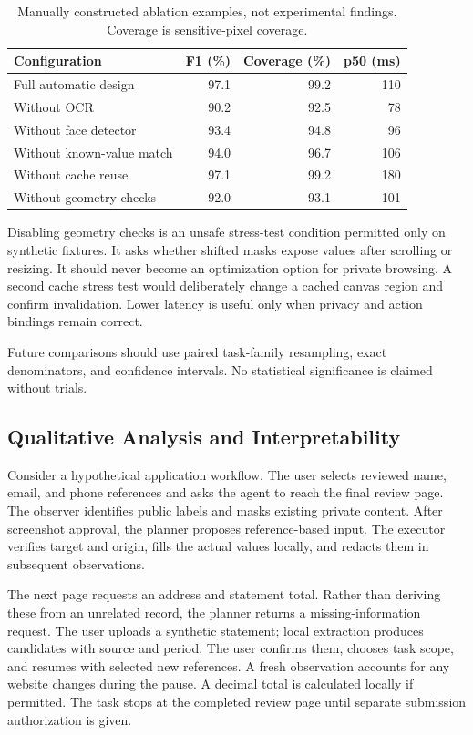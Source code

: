 \documentclass[conference]{IEEEtran}
\begin{document}
\begin{table}[t]
\centering\small
\caption{Manually constructed ablation examples, not experimental findings. Coverage is sensitive-pixel coverage.}
\label{tab:ablation}
\begin{tabular}{lrrr}
\toprule
Configuration & F1 (\%) & Coverage (\%) & p50 (ms)\\
\midrule
Full automatic design & 97.1 & 99.2 & 110\\
Without OCR & 90.2 & 92.5 & 78\\
Without face detector & 93.4 & 94.8 & 96\\
Without known-value match & 94.0 & 96.7 & 106\\
Without cache reuse & 97.1 & 99.2 & 180\\
Without geometry checks & 92.0 & 93.1 & 101\\
\bottomrule
\end{tabular}
\end{table}

Disabling geometry checks is an unsafe stress-test condition permitted only on synthetic fixtures. It asks whether shifted masks expose values after scrolling or resizing. It should never become an optimization option for private browsing. A second cache stress test would deliberately change a cached canvas region and confirm invalidation. Lower latency is useful only when privacy and action bindings remain correct.

Future comparisons should use paired task-family resampling, exact denominators, and confidence intervals. No statistical significance is claimed without trials.

\subsection{Qualitative Analysis and Interpretability}
Consider a hypothetical application workflow. The user selects reviewed name, email, and phone references and asks the agent to reach the final review page. The observer identifies public labels and masks existing private content. After screenshot approval, the planner proposes reference-based input. The executor verifies target and origin, fills the actual values locally, and redacts them in subsequent observations.

The next page requests an address and statement total. Rather than deriving these from an unrelated record, the planner returns a missing-information request. The user uploads a synthetic statement; local extraction produces candidates with source and period. The user confirms them, chooses task scope, and resumes with selected new references. A fresh observation accounts for any website changes during the pause. A decimal total is calculated locally if permitted. The task stops at the completed review page until separate submission authorization is given.
\end{document}
